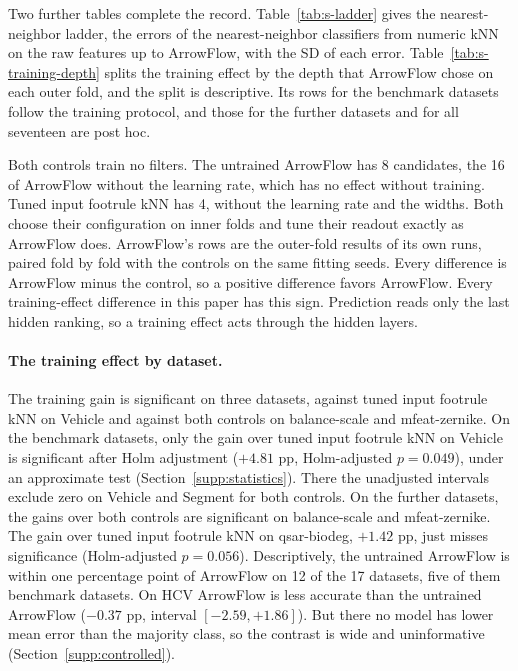Two further tables complete the record. Table~\ref{tab:s-ladder} gives the nearest-neighbor ladder, the errors of the nearest-neighbor classifiers from numeric kNN on the raw features up to ArrowFlow, with the SD of each error. Table~\ref{tab:s-training-depth} splits the training effect by the depth that ArrowFlow chose on each outer fold, and the split is descriptive. Its rows for the benchmark datasets follow the training protocol, and those for the further datasets and for all seventeen are post hoc.

Both controls train no filters. The untrained ArrowFlow has 8 candidates, the 16 of ArrowFlow without the learning rate, which has no effect without training. Tuned input footrule kNN has 4, without the learning rate and the widths. Both choose their configuration on inner folds and tune their readout exactly as ArrowFlow does. ArrowFlow's rows are the outer-fold results of its own runs, paired fold by fold with the controls on the same fitting seeds. Every difference is ArrowFlow minus the control, so a positive difference favors ArrowFlow. Every training-effect difference in this paper has this sign. Prediction reads only the last hidden ranking, so a training effect acts through the hidden layers.

\paragraph{The training effect by dataset.} The training gain is significant on three datasets, against tuned input footrule kNN on Vehicle and against both controls on balance-scale and mfeat-zernike. On the benchmark datasets, only the gain over tuned input footrule kNN on Vehicle is significant after Holm adjustment ($+4.81$ pp, Holm-adjusted $p=0.049$), under an approximate test (Section~\ref{supp:statistics}). There the unadjusted intervals exclude zero on Vehicle and Segment for both controls. On the further datasets, the gains over both controls are significant on balance-scale and mfeat-zernike. The gain over tuned input footrule kNN on qsar-biodeg, $+1.42$ pp, just misses significance (Holm-adjusted $p=0.056$). Descriptively, the untrained ArrowFlow is within one percentage point of ArrowFlow on 12 of the 17 datasets, five of them benchmark datasets. On HCV ArrowFlow is less accurate than the untrained ArrowFlow ($-0.37$ pp, interval $[-2.59,+1.86]$). But there no model has lower mean error than the majority class, so the contrast is wide and uninformative (Section~\ref{supp:controlled}).

